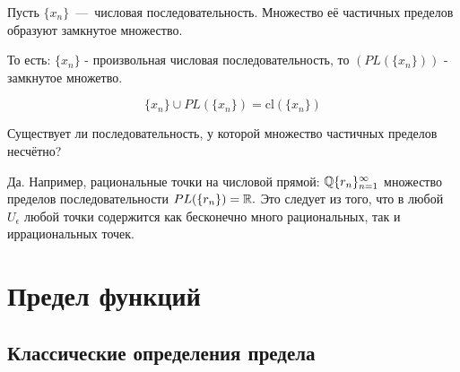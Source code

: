 \begin{proposition}
    Пусть $\{ x_{n} \}$~---~числовая последовательность. Множество её частичных пределов образуют замкнутое множество.
    
    То есть: 
    $\{ x_{n} \}$ - произвольная числовая последовательность, то $(PL(\{ x_{n} \}))$ - замкнутое множетво.
    
\[\{ x_{n} \} \cup PL(\{ x_{n} \}) = \text{cl}(\{ x_{n} \})
\]
\end{proposition}

\begin{problem}
    Существует ли последовательность, у которой множество частичных пределов несчётно?
\end{problem}

\begin{solution}
    Да. Например, рациональные точки на числовой прямой: $\mathbb{Q} \{ r_{n} \}_{n=1}^{\infty}$ множество пределов последовательности $PL(\{ r_{n} \}) = \mathbb{R}.$ Это следует из того, что в любой $U_{\epsilon}$ любой точки содержится как бесконечно много рациональных, так и иррациональных точек.
\end{solution}

\newpage
\section{Предел функций}

\subsection{Классические определения предела}


